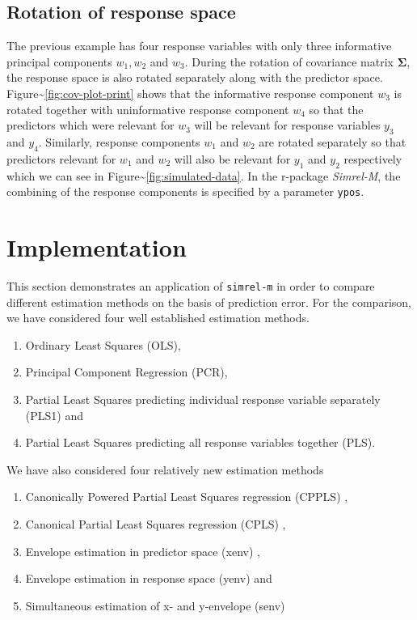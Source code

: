 \documentclass[12pt,A4paper,authoryear]{elsarticle} %
\providecommand{\tightlist}{%
  \setlength{\itemsep}{0pt}\setlength{\parskip}{0pt}}
\theoremstyle{definition}
\theoremstyle{definition}
\theoremstyle{remark}
\begin{document}
\hypertarget{rotation-of-response-space}{\subsection{Rotation of
response space}\label{rotation-of-response-space}}

The previous example has four response variables with only three
informative principal components \(w_1, w_2\) and \(w_3\). During the
rotation of covariance matrix \(\boldsymbol{\Sigma}\), the response
space is also rotated separately along with the predictor space.
Figure\textasciitilde{}\ref{fig:cov-plot-print} shows that the
informative response component \(w_3\) is rotated together with
uninformative response component \(w_4\) so that the predictors which
were relevant for \(w_3\) will be relevant for response variables
\(y_3\) and \(y_4\). Similarly, response components \(w_1\) and \(w_2\)
are rotated separately so that predictors relevant for \(w_1\) and
\(w_2\) will also be relevant for \(y_1\) and \(y_2\) respectively which
we can see in Figure\textasciitilde{}\ref{fig:simulated-data}. In the
r-package \emph{Simrel-M}, the combining of the response components is
specified by a parameter \texttt{ypos}.

\hypertarget{implementation}{\section{Implementation}\label{implementation}}

This section demonstrates an application of \texttt{simrel-m} in order
to compare different estimation methods on the basis of prediction
error. For the comparison, we have considered four well established
estimation methods.

\begin{enumerate}
\def\labelenumi{\alph{enumi})}
\tightlist
\item
  Ordinary Least Squares (OLS),
\item
  Principal Component Regression (PCR),
\item
  Partial Least Squares predicting individual response variable
  separately (PLS1) and
\item
  Partial Least Squares predicting all response variables together
  (PLS).
\end{enumerate}

We have also considered four relatively new estimation methods

\begin{enumerate}
\def\labelenumi{\alph{enumi})}
\tightlist
\item
  Canonically Powered Partial Least Squares regression (CPPLS)
  \citep{indahl2009canonical},
\item
  Canonical Partial Least Squares regression (CPLS)
  \citep{indahl2009canonical},
\item
  Envelope estimation in predictor space (xenv)
  \citep{cook2010envelope},
\item
  Envelope estimation in response space (yenv)
  \citep{cook2015foundations} and
\item
  Simultaneous estimation of x- and y-envelope (senv)
  \citep{cook2015simultaneous}
\end{enumerate}
\end{document}
